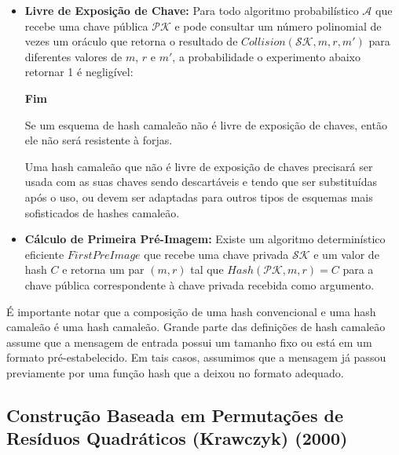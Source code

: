 \documentclass[a4paper]{article}
\begin{document}
\begin{itemize}
\item\textbf{Livre de Exposição de Chave:} Para todo algoritmo
  probabilístico $\mathcal{A}$ que recebe uma chave pública
  $\mathcal{PK}$ e pode consultar um número polinomial de vezes um
  oráculo que retorna o resultado de $Collision(\mathcal{SK}, m, r,
  m')$ para diferentes valores de $m$, $r$ e $m'$, a probabilidade o
  experimento abaixo retornar 1 é negligível:

\noindent
  \begin{algorithm}[H]
    \SetAlgoLined
     \textbf{Fim}
  \end{algorithm}

  Se um esquema de hash camaleão não é livre de exposição de chaves,
  então ele não será resistente à forjas.

  Uma hash camaleão que não é livre de exposição de chaves precisará
  ser usada com as suas chaves sendo descartáveis e tendo que ser
  substituídas após o uso, ou devem ser adaptadas para outros tipos de
  esquemas mais sofisticados de hashes camaleão.
\item\textbf{Cálculo de Primeira Pré-Imagem:} Existe um algoritmo
  determinístico eficiente $FirstPreImage$ que recebe uma chave
  privada $\mathcal{SK}$ e um valor de hash $C$ e retorna um par $(m,
  r)$ tal que $Hash(\mathcal{PK}, m, r) = C$ para a chave pública
  correspondente à chave privada recebida como argumento.
\end{itemize}
  

É importante notar que a composição de uma hash convencional e uma
hash camaleão é uma hash camaleão. Grande parte das definições de hash
camaleão assume que a mensagem de entrada possui um tamanho fixo ou
está em um formato pré-estabelecido. Em tais casos, assumimos que a
mensagem já passou previamente por uma função hash que a deixou no
formato adequado.

\subsection{Construção Baseada em Permutações de Resíduos Quadráticos (Krawczyk)
  (2000) \cite{krawczyk}}
\end{document}
